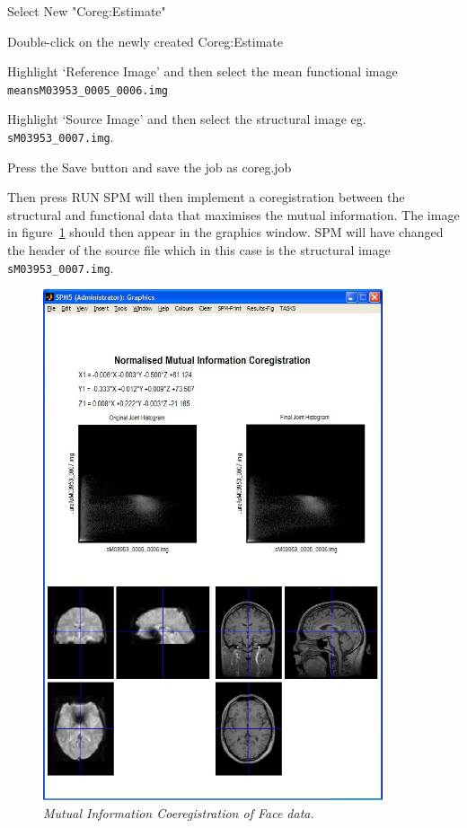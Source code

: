 \bi
\item{Select New "Coreg:Estimate"}
\item{Double-click on the newly created Coreg:Estimate}
\item{Highlight `Reference Image' and then select the
 mean functional image
\verb!meansM03953_0005_0006.img!}
\item{Highlight `Source Image' and then select 
the structural image eg. \verb!sM03953_0007.img!.}
\item{Press the Save button and save the job as 
{\sf coreg.job}}
\item{Then press RUN}
\ei
SPM will then implement a coregistration between the structural and functional data that maximises the mutual
information. The image in figure~\ref{face_coreg} should then appear 
in the graphics window. SPM will have changed the header 
of the source file which in this case is the 
structural image \verb!sM03953_0007.img!.
\begin{figure}
\begin{center}
\includegraphics[width=100mm]{faces/coreg}
\caption{\em Mutual Information Coeregistration of Face data. \label{face_coreg}}
\end{center}
\end{figure}

